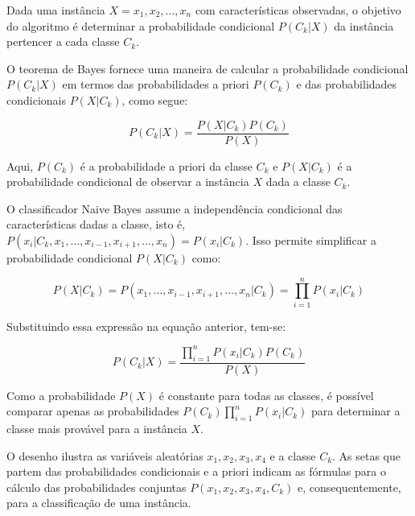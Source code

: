 Dada uma instância $X = {x_1, x_2, \dots, x_n}$ com características observadas, o objetivo do algoritmo é determinar a probabilidade condicional $P(C_k|X)$ da instância pertencer a cada classe $C_k$.

O teorema de Bayes fornece uma maneira de calcular a probabilidade condicional $P(C_k|X)$ em termos das probabilidades a priori $P(C_k)$ e das probabilidades condicionais $P(X|C_k)$, como segue:

\begin{equation}
    P(C_k|X)=\frac{P(X|C_k)P(C_k)}{P(X)}
\end{equation}

Aqui, $P(C_k)$ é a probabilidade a priori da classe $C_k$ e $P(X|C_k)$ é a probabilidade condicional de observar a instância $X$ dada a classe $C_k$.

O classificador Naive Bayes assume a independência condicional das características dadas a classe, isto é, $P(x_i|C_k, x_1, \dots, x_{i-1}, x_{i+1}, \dots, x_n) = P(x_i|C_k)$. Isso permite simplificar a probabilidade condicional $P(X|C_k)$ como:

\begin{equation}
    P(X|C_k)=P(x_1, \dots, x_{i-1}, x_{i+1}, \dots, x_n|C_k)=\prod_{i=1}^{n}P(x_i|C_k)
\end{equation}

Substituindo essa expressão na equação anterior, tem-se:

\begin{equation}
    P(C_k|X)=\frac{\prod_{i=1}^{n}P(x_i|C_k)P(C_k)}{P(X)}
\end{equation}

Como a probabilidade $P(X)$ é constante para todas as classes, é possível comparar apenas as probabilidades $P(C_k)\prod_{i=1}^n P(x_i|C_k)$ para determinar a classe mais provável para a instância $X$.

O desenho ilustra as variáveis aleatórias $x_1, x_2, x_3, x_4$ e a classe $C_k$. As setas que partem das probabilidades condicionais e a priori indicam as fórmulas para o cálculo das probabilidades conjuntas $P(x_1, x_2, x_3, x_4, C_k)$ e, consequentemente, para a classificação de uma instância.

